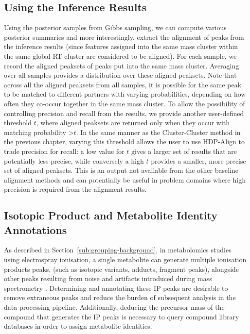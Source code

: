 \subsection{Using the Inference Results}

\label{subsub:feature-matching}

Using the posterior samples from Gibbs sampling, we can compute various posterior summaries and more interestingly, extract the alignment of peaks from the inference results (since features assigned into the same mass cluster within the same global RT cluster are considered to be aligned). For each sample, we record the aligned peaksets of peaks put into the same mass cluster. Averaging over all samples provides a distribution over these aligned peaksets. Note that across all the aligned peaksets from all samples, it is possible for the same peak to be matched to different partners with varying probabilities, depending on how often they co-occur together in the same mass cluster. To allow the possibility of controlling precision and recall from the results, we provide another user-defined threshold $t$, where aligned peaksets are returned only when they occur with matching probability \textgreater $t$. In the same manner as the Cluster-Cluster method in the previous chapter, varying this threshold allows the user to use HDP-Align to trade precision for recall: a low value for $t$ gives a larger set of results that are potentially less precise, while conversely a high $t$ provides a smaller, more precise set of aligned peaksets. This is an output not available from the other baseline alignment methods and can potentially be useful in problem domains where high precision is required from the alignment results.

\subsection{Isotopic Product and Metabolite Identity Annotations}
\label{subsub:isotopic-product-annotations}

As described in Section~\ref{sub:grouping-background}, in metabolomics studies using electrospray ionisation, a single metabolite can generate multiple ionisation products peaks, (such as isotopic variants, adducts, fragment peaks), alongside other peaks resulting from noise and artifacts introduced during mass spectrometry \cite{Lee2013}. Determining and annotating these IP peaks are desirable to remove extraneous peaks and reduce the burden of subsequent analysis in the data processing pipeline. Additionally, deducing the precursor mass of the compound that generates the IP peaks is necessary to query compound library databases in order to assign metabolite identities. 

